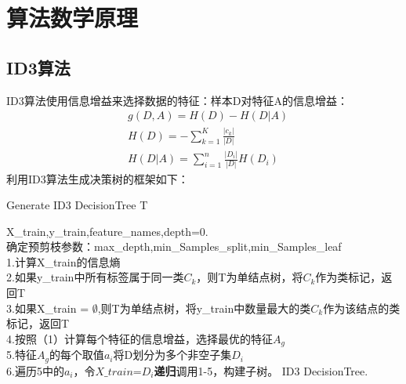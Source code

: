 \documentclass{SHUarticle}
\begin{document}
\section{算法数学原理}
\subsection{ID3算法}
ID3算法使用信息增益来选择数据的特征：样本D对特征A的信息增益：
\begin{equation}
	\begin{aligned}
	& g(D,A)=H(D)-H(D|A)\\
	&H(D) = -\sum\limits_{k=1}^K\frac{|c_k|}{|D|} \\ 
	&H(D|A)= \sum\limits_{i=1}^n\frac{|D_i|}{|D|}H(D_i) 
	\end{aligned}
	\end{equation}
利用ID3算法生成决策树的框架如下：
\begin{algorithm}
	\caption{Generate ID3 DecisionTree T }
	\label{algo:ref}
	\begin{algorithmic}[1]
		\REQUIRE X\_train,y\_train,feature\_names,depth=0.  %
		\ENSURE ~\\           %
		  确定预剪枝参数：max\_depth,min\_Samples\_split,min\_Samples\_leaf\\
		\STATE
		  1.计算X\_train的信息熵\\
		  2.如果y\_train中所有标签属于同一类$C_k$，则T为单结点树，将$C_k$作为类标记，返回T\\
		  3.如果X\_train = $\emptyset$,则T为单结点树，将y\_train中数量最大的类$C_k$作为该结点的类标记，返回T\\
		  4.按照（1）计算每个特征的信息增益，选择最优的特征$A_g$\\
		  5.特征$A_g$的每个取值$a_i$将D划分为多个非空子集$D_i$\\
		  6.遍历5中的$a_i$，令$X\_train$=$D_i$\textbf{递归}调用1-5，构建子树。
		\ENDWHILE
		\RETURN ID3 DecisionTree.  %
	\end{algorithmic}
\end{algorithm}
\end{document}
